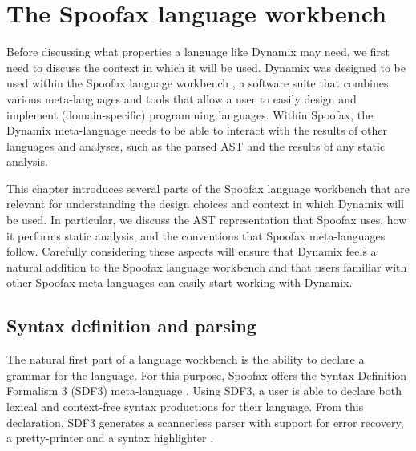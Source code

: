 
\chapter{\label{ch:spoofax}The Spoofax language workbench}


Before discussing what properties a language like Dynamix may need, we first need to discuss the context in which it will be used. Dynamix was designed to be used within the Spoofax language workbench \cite{Spoofax2021}, a software suite that combines various meta-languages and tools that allow a user to easily design and implement (domain-specific) programming languages. Within Spoofax, the Dynamix meta-language needs to be able to interact with the results of other languages and analyses, such as the parsed \ac{AST} and the results of any static analysis.

This chapter introduces several parts of the Spoofax language workbench that are relevant for understanding the design choices and context in which Dynamix will be used. In particular, we discuss the \ac{AST} representation that Spoofax uses, how it performs static analysis, and the conventions that Spoofax meta-languages follow. Carefully considering these aspects will ensure that Dynamix feels a natural addition to the Spoofax language workbench and that users familiar with other Spoofax meta-languages can easily start working with Dynamix.


\section{\label{sec:spoofax_parsing_aterm}Syntax definition and parsing}

The natural first part of a language workbench is the ability to declare a grammar for the language. For this purpose, Spoofax offers the Syntax Definition Formalism 3 (SDF3) meta-language \cite{Amorim2019}. Using SDF3, a user is able to declare both lexical and context-free syntax productions for their language. From this declaration, SDF3 generates a scannerless parser with support for error recovery, a pretty-printer and a syntax highlighter \cite{AmorimV20}.\\

